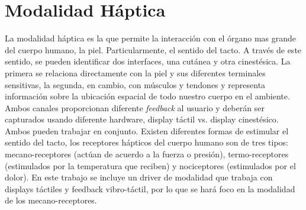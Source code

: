 
\chapter{Modalidad H\'{a}ptica} %

\label{ch:mod_haptic} 


La modalidad háptica es la que permite la interacción con el órgano mas grande del cuerpo humano, la piel. Particularmente, el sentido del tacto.
A través de este sentido, se pueden identificar dos interfaces, una cutánea y otra cinestésica. La primera se relaciona directamente con la piel y sus diferentes terminales sensitivas, la segunda, en cambio, con músculos y tendones y representa información sobre la ubicación espacial de todo nuestro cuerpo en el ambiente. Ambos canales proporcionan diferente \emph{feedback} al usuario y deberán ser capturados usando diferente hardware, \ie display táctil vs. display cinestésico. Ambos pueden trabajar en conjunto. 
Existen diferentes formas de estimular el sentido del tacto, los receptores hápticos del cuerpo humano son de tres tipos: mecano-receptores (actúan de acuerdo a la fuerza o presión), termo-receptores (estimulados por la temperatura que reciben) y nociceptores (estimulados por el dolor). En este trabajo se incluye un driver de modalidad que trabaja con displays táctiles y feedback vibro-táctil, por lo que se hará foco en la modalidad de los mecano-receptores.
